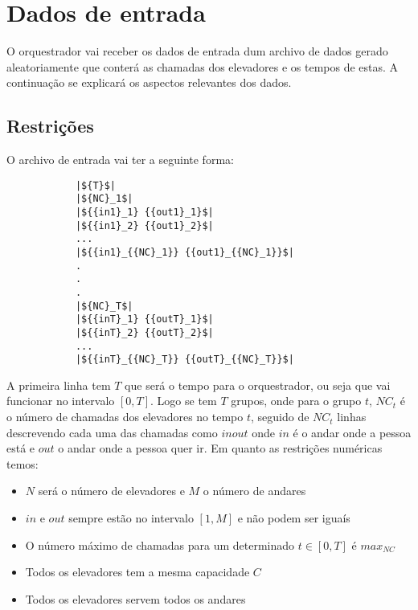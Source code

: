 \section{Dados de entrada}

O orquestrador vai receber os dados de entrada dum archivo de dados gerado aleatoriamente que conterá as chamadas dos elevadores e os tempos de estas. A continuação se explicará os aspectos relevantes dos dados.

\subsection{Restrições}
\label{subsec:restricoes}
	O archivo de entrada vai ter a seguinte forma: \\
		\begin{lstlisting}
			|${T}$|
			|${NC}_1$|
			|${{in1}_1} {{out1}_1}$|
			|${{in1}_2} {{out1}_2}$|
			...
			|${{in1}_{{NC}_1}} {{out1}_{{NC}_1}}$|
			.
			.
			.
			|${NC}_T$|
			|${{inT}_1} {{outT}_1}$|
			|${{inT}_2} {{outT}_2}$|
			...
			|${{inT}_{{NC}_T}} {{outT}_{{NC}_T}}$|
		\end{lstlisting}
	A primeira linha tem $T$ que será o tempo para o orquestrador, ou seja que vai funcionar no intervalo $[ 0 , T ]$. Logo se tem $T$ grupos, onde para o grupo $t$, ${NC}_t$ é o número de chamadas dos elevadores no tempo $t$, seguido de ${NC}_t$ linhas descrevendo cada uma das chamadas como ${in} {out}$ onde ${in}$ é o andar onde a pessoa está e ${out}$ o andar onde a pessoa quer ir.
	Em quanto as restrições numéricas temos:
	\begin{itemize}
		\item $N$ será o número de elevadores e $M$ o número de andares
		\item ${in}$ e ${out}$ sempre estão no intervalo $[1,M]$ e não podem ser iguaís
		\item O número máximo de chamadas para um determinado $t \in [0,T]$ é ${max_{NC}}$
		\item Todos os elevadores tem a mesma capacidade $C$
		\item Todos os elevadores servem todos os andares
	\end{itemize}
	
